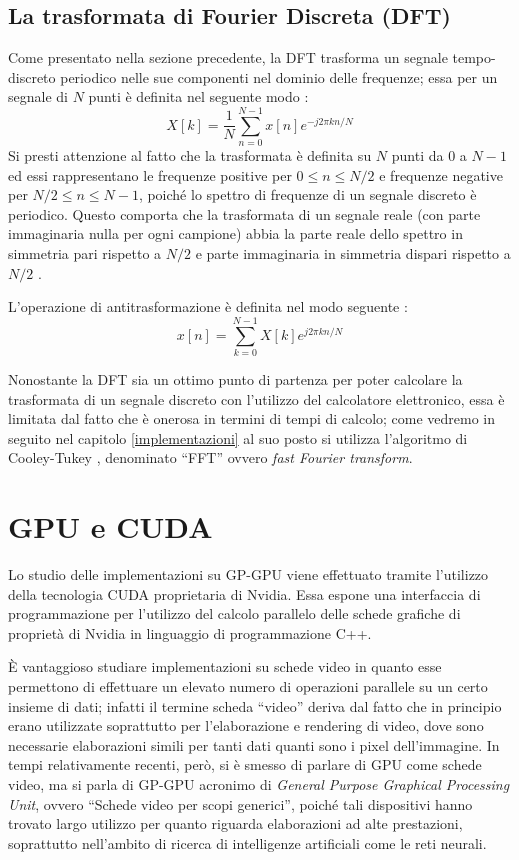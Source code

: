 \subsection{La trasformata di Fourier Discreta (DFT)}
Come presentato nella sezione precedente, la DFT trasforma un segnale tempo-discreto periodico nelle sue componenti nel dominio delle frequenze; essa per un segnale di $N$ punti è definita nel seguente modo \cite[p.~570]{dspguide}:
\begin{equation}
    X[k] = \frac{1}{N}\displaystyle\sum_{n=0}^{N-1}x[n]e^{-j 2\pi kn/N}
\end{equation}
Si presti attenzione al fatto che la trasformata è definita su $N$ punti da $0$ a $N-1$ ed essi rappresentano le frequenze positive per $0 \leq n \leq N/2$ e frequenze negative per $N/2 \leq n \leq N-1$, poiché lo spettro di frequenze di un segnale discreto è periodico. Questo comporta che la trasformata di un segnale reale (con parte immaginaria nulla per ogni campione) abbia la parte reale dello spettro in simmetria pari rispetto a $N/2$ e parte immaginaria in simmetria dispari rispetto a $N/2$ \cite[p.~570]{dspguide}.

L'operazione di antitrasformazione è definita nel modo seguente \cite[p.~572]{dspguide}:
\begin{equation}
    x[n] = \displaystyle\sum_{k=0}^{N-1}X[k]e^{j 2\pi kn/N}
\end{equation}

Nonostante la DFT sia un ottimo punto di partenza per poter calcolare la trasformata di un segnale discreto con l'utilizzo del calcolatore elettronico, essa è limitata dal fatto che è onerosa in termini di tempi di calcolo; come vedremo in seguito nel capitolo \ref{implementazioni} al suo posto si utilizza l'algoritmo di Cooley-Tukey \cite{cooleytukey}, denominato ``FFT'' ovvero \textit{fast Fourier transform}.

\section{GPU e CUDA}
Lo studio delle implementazioni su GP-GPU viene effettuato tramite l'utilizzo della tecnologia CUDA proprietaria di Nvidia. Essa espone una interfaccia di programmazione per l'utilizzo del calcolo parallelo delle schede grafiche di proprietà di Nvidia in linguaggio di programmazione C++.

È vantaggioso studiare implementazioni su schede video in quanto esse permettono di effettuare un elevato numero di operazioni parallele su un certo insieme di dati; infatti il termine scheda ``video'' deriva dal fatto che in principio erano utilizzate soprattutto per l'elaborazione e rendering di video, dove sono necessarie elaborazioni simili per tanti dati quanti sono i pixel dell'immagine. In tempi relativamente recenti, però, si è smesso di parlare di GPU come schede video, ma si parla di GP-GPU acronimo di \textit{General Purpose Graphical Processing Unit}, ovvero ``Schede video per scopi generici'', poiché tali dispositivi hanno trovato largo utilizzo per quanto riguarda elaborazioni ad alte prestazioni, soprattutto nell'ambito di ricerca di intelligenze artificiali come le reti neurali.

